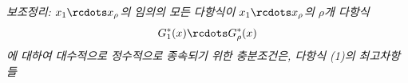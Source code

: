 
\emph{보조정리: $x_1\rcdots x_\rho$의 임의의 모든 다항식이 $x_1\rcdots x_\rho$의 $\rho$개 다항식
\[
G_1^*(x)\rcdots G_\rho^*(x)
\]
에 대하여 대수적으로 정수적으로 종속되기 위한 충분조건은, 다항식 (1)의 최고차항들}
